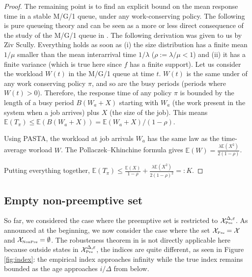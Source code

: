 \documentclass[11pt]{article}
\renewcommand{\epsilon}{\varepsilon}
\renewcommand{\leq}{\leqslant}
\newcommand{\E}{\mathbb{E}}
\newcommand{\cX}{\mathcal{X}}
\newcommand{\XP}{\mathcal{X}_{\mbox{\tiny Pre}}}
\newcommand{\XNP}{\mathcal{X}_{\mbox{\tiny NonPre}}}
\begin{document}
\begin{proof}
      


    The remaining point is to  find an explicit  bound on the mean response time in a stable M/G/1 queue, under any work-conserving policy. The following  is pure queueing theory and can be seen as a more or less direct consequence of the study of the M/G/1 queue in \cite{Mor}. The following derivation  was given to us by Ziv Scully.
    Everything  holds as soon as (i) the size distribution has a finite mean $1/\mu$ smaller than the mean interarrival time $1/\lambda$ ($\rho :=\lambda/\mu < 1$) and (ii) it has a finite variance (which  is true here since $f$ has a finite support).
    Let us consider the workload $W(t)$ in the M/G/1 queue at time $t$.  $W(t)$ is the same under of any work conserving policy $\pi$, and so are  the busy periods (periods where $W(t) > 0$).
    Therefore, the response time of any policy $\pi$ is bounded by the length of a busy period $B(W_a+X)$ starting with $W_a$ (the work present in the system when a job arrives)  plus $X$ (the size of the job).
    This means $\E(T_\pi) \leq  \E(B(W_a+X)) = \E(W_a + X)/ (1-\rho)$.
    
    Using  PASTA, the workload at job arrivals $W_a$ has the same law as  the time-average worload $W$. The Pollaczek–Khinchine formula gives 
    $\E(W) = \frac{\lambda \E(X^2)}{2(1-\rho)}$.
    
    Putting everything together,
    $\E(T_\pi) \leq  \frac{\E(X)}{1-\rho} + \frac{\lambda\E(X^2)}{2(1-\rho)^2} =:K$.
   
  \end{proof}


  


  \subsection{Empty non-preemptive set}
  \label{ssec:no-preemption}
 So far, we considered the case where the preemptive set is restricted to $\XP^{\Delta,\epsilon}$.
  As announced  at the beginning, we now consider the case where the set $\XP = \cX$ and $\XNP = \emptyset$.
  The robusteness theorem in  \cite{ScullyPhD} is not directly applicable here because outside states in   $\XP^{\Delta,\epsilon} $, 
  the indices are quite different, as seen in  Figure \ref{fig:index}:  the empirical index approaches infinity while the true index remains bounded as the age approaches $i/\Delta$ from below.
\end{document}
